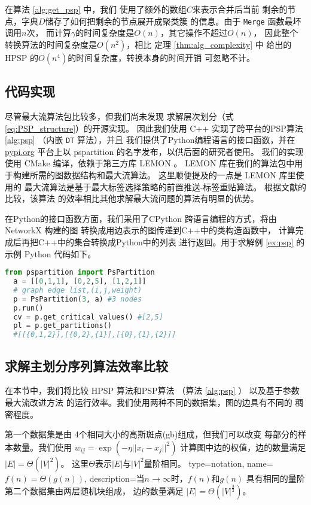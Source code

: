 在算法 \ref{alg:get_psp} 中，我们
使用了额外的数组$C$来表示合并后当前
剩余的节点，字典$D$储存了如何把剩余的节点展开成聚类簇
的信息。由于 \texttt{Merge} 函数最坏调用$n$次，
而计算$\gamma$的时间复杂度是$O(n)$，其它操作不超过$O(n)$，
因此整个转换算法的时间复杂度是$O(n^2)$，相比
定理 \ref{thm:alg_complexity} 中
给出的HPSP 的$O(n^4)$的时间复杂度，转换本身的时间开销
可忽略不计。

\subsection{代码实现}
尽管最大流算法包比较多，但我们尚未发现
求解层次划分（式\eqref{eq:PSP_structure}）的开源实现。
因此我们使用 C++ 实现了跨平台的PSP算法 \ref{alg:psp} 
（内嵌 \texttt{DT} 算法），并且
我们提供了Python编程语言的接口函数，并在 \url{pypi.org}
平台上以 pspartition
的名字发布，以供后面的研究者使用。
我们的实现使用 CMake 编译，依赖于第三方库 LEMON \cite{dezsHo2011lemon}。 
LEMON 库在我们的算法包中用于构建所需的图数据结构和最大流算法。
这里顺便提及的一点是 LEMON 库里使用的
最大流算法是基于最大标签选择策略的前置推送-标签重贴算法。
根据文献的比较，该算法
的效率相比其他求解最大流问题的算法有明显的优势。

在Python的接口函数方面，我们采用了CPython
跨语言编程的方式，将由 NetworkX \cite{SciPyProceedings_11} 构建的图
转换成用边表示的图传递到C++中的类构造函数中，
计算完成后再把C++中的集合转换成Python中的列表
进行返回。用于求解例 \ref{ex:psp} 的示例 Python 代码如下。
\begin{lstlisting}[language=Python]
  from pspartition import PsPartition
  a = [[0,1,1], [0,2,5], [1,2,1]] 
  # graph edge list,(i,j,weight)
  p = PsPartition(3, a) #3 nodes
  p.run()
  cv = p.get_critical_values() #[2,5]
  pl = p.get_partitions()
  #[[{0,1,2}],[{0,2},{1}],[{0},{1},{2}]]
\end{lstlisting}

\subsection{求解主划分序列算法效率比较}
在本节中，我们将比较 HPSP 算法和PSP算法
（算法 \ref{alg:psp} ）
以及基于参数最大流改进方法\cite{kolmogorov}
的运行效率。我们使用两种不同的数据集，图的边具有不同的
稠密程度。

第一个数据集是由
4个相同大小的高斯斑点(\glsdesc{gb})组成，但我们可以改变
每部分的样本数量。我们使用
  $w_{ij}=\exp(-\eta ||x_i-x_j||^2)$
计算图中边的权值，边的数量满足 $|E|=\Theta(|V|^2)$。
这里$\Theta$表示$|E|$与$|V|^2$量阶相同。
{
  type=notation,
  name={$f(n)=\Theta(g(n))$},
  description={当$n\to \infty$时，$f(n)$和$g(n)$ 具有相同的量阶}
}
第二个数据集由两层随机块组成，
边的数量满足 $|E|=\Theta(|V|^{\frac{3}{2}})$。

